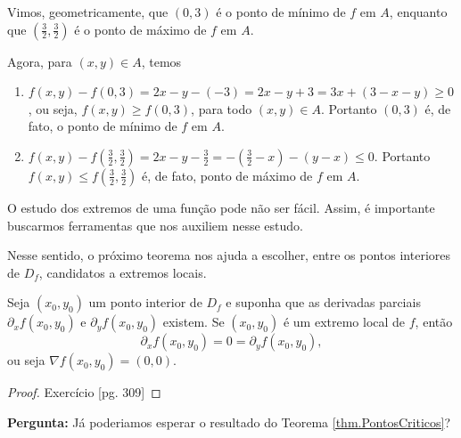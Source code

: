 \begin{example}
    Vimos, geometricamente, que \((0,3)\) é o ponto de mínimo de \(f\) em \(A\), enquanto que \(\left( \frac{3}{2},\frac{3}{2} \right)\) é o ponto de máximo de \(f\) em \(A\).

    Agora, para \((x,y)\in A\), temos
        \begin{enumerate}
            \item \(f(x,y) - f(0,3) = 2x - y -(-3) = 2x - y + 3 = 3x + (3-x-y) \geq 0\), ou seja, \(f(x,y) \geq f(0,3)\), para todo \((x,y)\in A\). Portanto \((0,3)\) é, de fato, o ponto de mínimo de \(f\) em \(A\).
            \item \(f(x,y) - f\left( \frac{3}{2},\frac{3}{2} \right) = 2x - y - \frac{3}{2} = - \left( \frac{3}{2} - x \right) - (y-x) \leq 0\). Portanto \(f(x,y)\leq f\left( \frac{3}{2},\frac{3}{2} \right)\) é, de fato, ponto de máximo de \(f\) em \(A\).
        \end{enumerate}
\end{example}

O estudo dos extremos de uma função pode não ser fácil. Assim, é importante buscarmos ferramentas que nos auxiliem nesse estudo.

Nesse sentido, o próximo teorema nos ajuda a escolher, entre os pontos interiores de \(D_f\), candidatos a extremos locais.

\begin{theorem}\label{thm.PontosCriticos}
    Seja \((x_0,y_0)\) um ponto interior de \(D_f\) e suponha que as derivadas parciais \(\partial_x f(x_0,y_0)\) e \(\partial_y f(x_0,y_0)\) existem. Se \((x_0,y_0)\) é um extremo local de \(f\), então \[\partial_x f(x_0,y_0) = 0 = \partial_y f(x_0,y_0),\] ou seja \(\nabla f(x_0,y_0) = (0,0)\).
\end{theorem}

\begin{proof}
    Exercício \cite{guidorizzi}[pg. 309]
\end{proof}

\textbf{Pergunta: } Já poderiamos esperar o resultado do Teorema \ref{thm.PontosCriticos}?

